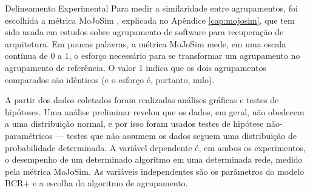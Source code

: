 \begin{section}{Delineamento Experimental}
	Para medir a similaridade entre agrupamentos, foi escolhida a métrica MoJoSim \cite{Tzerpos1999,Bittencourt2009}, explicada no Apêndice \ref{cap:mojosim}, que tem sido usada em estudos sobre agrupamento de software para recuperação de arquitetura. Em poucas palavras, a métrica MoJoSim mede, em uma escala contínua de 0 a 1, o esforço necessário para se transformar um agrupamento no agrupamento de referência. O valor 1 indica que os dois agrupamentos comparados são idênticos (e o esforço é, portanto, nulo).

	A partir dos dados coletados foram realizadas análises gráficas e testes de hipóteses. Uma análise preliminar revelou que os dados, em geral, não obedecem a uma distribuição normal, e por isso foram usados testes de hipótese não-paramétricos --- testes que não assumem os dados seguem uma distribuição de probabilidade determinada. A variável dependente é, em ambos os experimentos, o desempenho de um determinado algoritmo em uma determinada rede, medido pela métrica MoJoSim. As variáveis independentes são os parâmetros do modelo BCR+ e a escolha do algoritmo de agrupamento.
	
	

\end{section}


